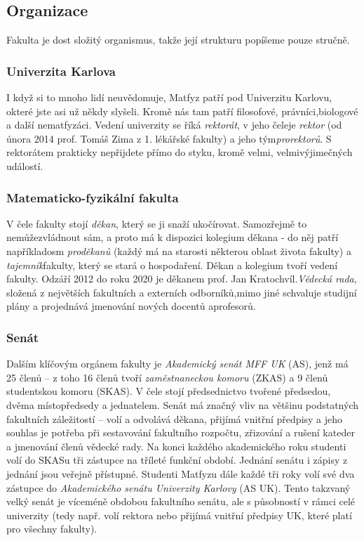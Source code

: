 \subsection{Organizace}
Fakulta je dost složitý organismus, takže její strukturu popíšeme pouze stručně.


\subsubsection{Univerzita Karlova}
I když si to mnoho lidí neuvědomuje, Matfyz patří pod Univerzitu Karlovu, okteré
jste asi už někdy slyšeli. Kromě nás tam patří filosofové, právníci,biologové a
další nematfyzáci. Vedení univerzity se říká \textit{rektorát}, v jeho čeleje
\textit{rektor} (od února 2014 prof. Tomáš Zima z 1. lékářské fakulty) a jeho
tým\textit{prorektorů}. S rektorátem prakticky nepřijdete přímo do styku, kromě
velmi, velmivýjimečných událostí.


\subsubsection{Matematicko-fyzikální fakulta}
V čele fakulty stojí \textit{děkan}, který se ji snaží ukočírovat. Samozřejmě to
nemůžezvládnout sám, a proto má k dispozici kolegium děkana - do něj patří
napříkladosm \textit{proděkanů} (každý má na starosti některou oblast života
fakulty) a \textit{tajemník}fakulty, který se stará o hospodaření. Děkan a
kolegium tvoří vedení fakulty. Odzáří 2012 do roku 2020 je děkanem prof. Jan
Kratochvíl.\textit{Vědecká rada}, složená z největších fakultních a externích
odborníků,mimo jiné schvaluje studijní plány a projednává jmenování nových
docentů aprofesorů.


\subsubsection{Senát}
Dalším klíčovým orgánem fakulty je \textit{Akademický senát MFF UK} (AS), jenž
má 25 členů – z toho 16 členů tvoří \textit{zaměstnaneckou komoru} (ZKAS) a 9
členů studentskou komoru (SKAS). V čele stojí předsednictvo tvořené předsedou,
dvěma místopředsedy a jednatelem. Senát má značný vliv na většinu podstatných
fakultních záležitostí – volí a odvolává děkana, přijímá vnitřní předpisy a jeho
souhlas je potřeba při sestavování fakultního rozpočtu, zřizování a rušení
kateder a jmenování členů vědecké rady. Na konci každého akademického roku
studenti volí do SKASu tři zástupce na tříleté funkční období. Jednání senátu i
zápisy z jednání jsou veřejně přístupné. Studenti Matfyzu dále každé tři roky
volí své dva zástupce do \textit{Akademického senátu Univerzity Karlovy} (AS
UK). Tento takzvaný velký senát je víceméně obdobou fakultního senátu, ale s
působností v rámci celé univerzity (tedy např. volí rektora nebo přijímá vnitřní
předpisy UK, které platí pro všechny fakulty).


